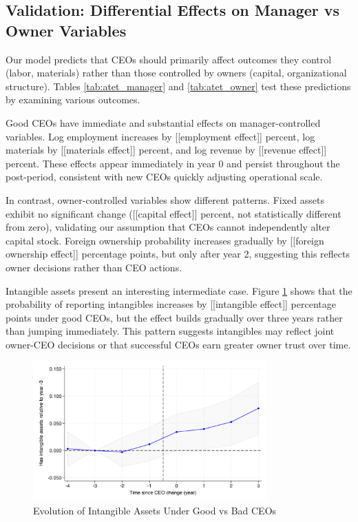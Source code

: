 \documentclass[11pt,a4paper]{article}
\begin{document}


\subsection{Validation: Differential Effects on Manager vs Owner Variables}

Our model predicts that CEOs should primarily affect outcomes they control (labor, materials) rather than those controlled by owners (capital, organizational structure). Tables \ref{tab:atet_manager} and \ref{tab:atet_owner} test these predictions by examining various outcomes.

Good CEOs have immediate and substantial effects on manager-controlled variables. Log employment increases by [[employment effect]] percent, log materials by [[materials effect]] percent, and log revenue by [[revenue effect]] percent. These effects appear immediately in year 0 and persist throughout the post-period, consistent with new CEOs quickly adjusting operational scale.



In contrast, owner-controlled variables show different patterns. Fixed assets exhibit no significant change ([[capital effect]] percent, not statistically different from zero), validating our assumption that CEOs cannot independently alter capital stock. Foreign ownership probability increases gradually by [[foreign ownership effect]] percentage points, but only after year 2, suggesting this reflects owner decisions rather than CEO actions.

Intangible assets present an interesting intermediate case. Figure \ref{fig:intangibles} shows that the probability of reporting intangibles increases by [[intangible effect]] percentage points under good CEOs, but the effect builds gradually over three years rather than jumping immediately. This pattern suggests intangibles may reflect joint owner-CEO decisions or that successful CEOs earn greater owner trust over time.

\begin{figure}[htbp]
\centering
\includegraphics[width=0.8\textwidth]{figure/event_study_has_intangible.pdf}
\caption{Evolution of Intangible Assets Under Good vs Bad CEOs}
\label{fig:intangibles}
\end{figure}
\end{document}
